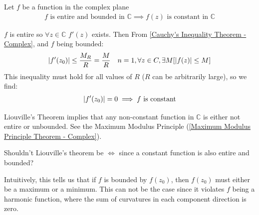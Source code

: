 \documentclass[12pt, english]{book}
\makeatletter
\renewenvironment{proof}[1][\proofname]{\par
	\pushQED{\qed}%
	\normalfont \topsep6\p@\@plus6\p@\relax
	\list{}{%
		\settowidth{\leftmargin}{\itshape\proofname:\hskip\labelsep}%
		\setlength{\labelwidth}{0pt}%
		\setlength{\itemindent}{-\leftmargin}%
		}%
	\item[\hskip\labelsep\itshape#1\@addpunct{:}]\ignorespaces
	}{\popQED\endlist\@endpefalse}
\makeatother
\begin{document}
	\begin{theorem}
		\label{Liouville's Theorem - Complex}
		Let \(f\) be a function in the complex plane
		\begin{align*}
			f \text{ is entire and bounded in } \mathbb{C} 
			\implies f(z) \text{ is constant in } \mathbb{C}
		\end{align*}
	\end{theorem}
	\begin{proof}
		\(f\) is entire so \(\forall z \in \mathbb{C}\) \(f'(z)\) exists. Then From \cref{Cauchy's Inequality Theorem - Complex}, and \(f\) being bounded:
		\begin{align*}
			\abs{f'(z_0)} &\leq \frac{M_R}{R} = \frac{M}{R}&  n=1, \forall z \in C,\exists M[\abs{f(z)} \leq M]
		\end{align*}
		This inequality must hold for all values of \(R\) (\(R\) can be arbitrarily large), so we find: 
		\begin{align*}
			\abs{f'(z_0)} = 0 \implies f \text{ is constant}
		\end{align*}
	\end{proof}
	
	\begin{observation}
		Liouville's Theorem implies that any non-constant function in \(\mathbb{C}\) is either not entire or unbounded. See the Maximum Modulus Principle (\cref{Maximum Modulus Principle Theorem - Complex}).
	\end{observation}

	\begin{question}
		Shouldn't Liouville's theorem be \(\iff\) since a constant function is also entire and bounded?
	\end{question}

	Intuitively, this tells us that if \(f\) is bounded by \(f(z_0)\), then \(f(z_0)\) must either be a maximum or a minimum. This can not be the case since it violates \(f\) being a harmonic function, where the sum of curvatures in each component direction is zero.
	
\end{document}
